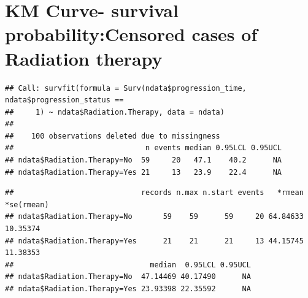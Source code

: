 \documentclass[
  11pt,
]{article}
\newenvironment{Shaded}{\begin{snugshade}}{\end{snugshade}}
\newcommand{\AttributeTok}[1]{\textcolor[rgb]{0.77,0.63,0.00}{#1}}
\newcommand{\DecValTok}[1]{\textcolor[rgb]{0.00,0.00,0.81}{#1}}
\newcommand{\FunctionTok}[1]{\textcolor[rgb]{0.00,0.00,0.00}{#1}}
\newcommand{\NormalTok}[1]{#1}
\newcommand{\OtherTok}[1]{\textcolor[rgb]{0.56,0.35,0.01}{#1}}
\newcommand{\SpecialCharTok}[1]{\textcolor[rgb]{0.00,0.00,0.00}{#1}}
\newcommand{\StringTok}[1]{\textcolor[rgb]{0.31,0.60,0.02}{#1}}
\begin{document}
\newpage
\section{KM Curve- survival probability:Censored cases of Radiation therapy}

\begin{Shaded}
\end{Shaded}

\begin{verbatim}
## Call: survfit(formula = Surv(ndata$progression_time, ndata$progression_status == 
##     1) ~ ndata$Radiation.Therapy, data = ndata)
## 
##    100 observations deleted due to missingness 
##                              n events median 0.95LCL 0.95UCL
## ndata$Radiation.Therapy=No  59     20   47.1    40.2      NA
## ndata$Radiation.Therapy=Yes 21     13   23.9    22.4      NA
\end{verbatim}

\begin{Shaded}
\end{Shaded}

\begin{verbatim}
##                             records n.max n.start events   *rmean *se(rmean)
## ndata$Radiation.Therapy=No       59    59      59     20 64.84633   10.35374
## ndata$Radiation.Therapy=Yes      21    21      21     13 44.15745   11.38353
##                               median  0.95LCL 0.95UCL
## ndata$Radiation.Therapy=No  47.14469 40.17490      NA
## ndata$Radiation.Therapy=Yes 23.93398 22.35592      NA
\end{verbatim}
\end{document}
